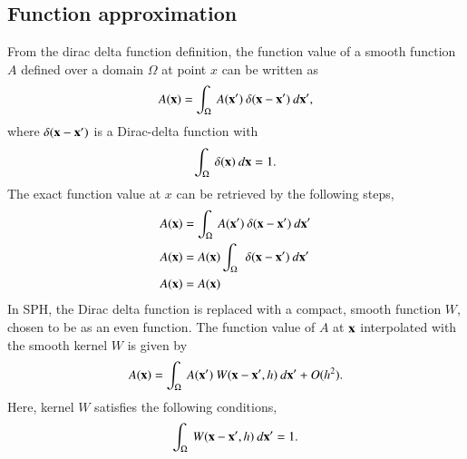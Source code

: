 \subsection{Function approximation}
From the dirac delta function definition, the function value of a smooth
function $A$ defined over a domain $\Omega$ at point $x$ can be written as
\begin{equation}
  \label{eq:dirac_repr}
  A(\mathbf{x}) = \int_{\Omega}\> A(\mathbf{x}') \> \delta(\mathbf{x} - \mathbf{x}') \> d\mathbf{x}',
\end{equation}
where $\delta(\mathbf{x} - \mathbf{x}')$ is a Dirac-delta function with
\begin{equation}
  \label{eq:unity}
  \int_{\Omega}\> \delta(\mathbf{x}) \> d\mathbf{x} = 1.
\end{equation}
The exact function value at $x$ can be retrieved by the following steps,
\begin{align*}
  \label{eq:dirac_derivation}
  A(\mathbf{x}) &= \int_{\Omega}\> A(\mathbf{x}') \> \delta(\mathbf{x} - \mathbf{x}') \> d\mathbf{x}'\\
  A(\mathbf{x}) &= A(\mathbf{x}) \int_{\Omega}\> \> \delta(\mathbf{x} - \mathbf{x}') \> d\mathbf{x}'\\
  A(\mathbf{x}) &= A(\mathbf{x})
\end{align*}
In SPH, the Dirac delta function is replaced with a compact, smooth function $W$,
chosen to be as an even function. The function value of $A$ at $\mathbf{x}$
interpolated with the smooth kernel $W$ is given by
\begin{equation}
  \label{eq:kernel_repr}
  A(\mathbf{x}) = \int_{\Omega}\> A(\mathbf{x}') \> W(\mathbf{x} - \mathbf{x}', h)  \> d\mathbf{x}' + O(h^2).
\end{equation}
Here, kernel $W$ satisfies the following conditions,
\begin{equation}
  \label{eq:unity}
  \int_{\Omega}\> W(\mathbf{x} - \mathbf{x}', h)  \> d\mathbf{x}' = 1.
\end{equation}

